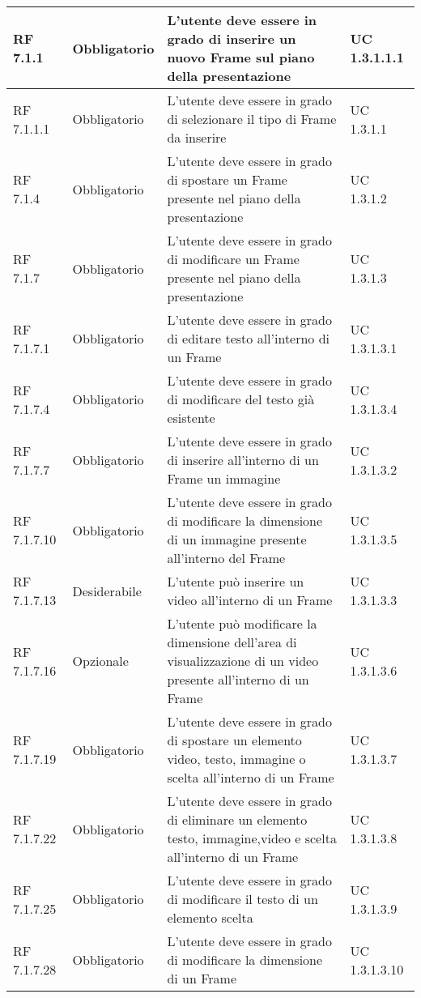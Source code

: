 {\begin{longtable} [c]{| p{2.5cm} | p{2.5cm} | p{6cm} |p{2.5cm}|}
		\hline
		RF 7.1.1 & Obbligatorio & L'utente deve essere in grado di inserire un nuovo Frame\ped{g} sul piano della presentazione\ped{g} & UC 1.3.1.1.1\\
		\hline
		RF 7.1.1.1 & Obbligatorio & L'utente deve essere in grado di selezionare il tipo di Frame\ped{g} da inserire & UC 1.3.1.1\\
		\hline
		RF 7.1.4 & Obbligatorio & L'utente deve essere in grado di spostare un Frame\ped{g} presente nel piano della presentazione\ped{g} & UC 1.3.1.2\\
		\hline
		RF 7.1.7 & Obbligatorio & L'utente deve essere in grado di modificare un Frame\ped{g} presente nel piano della presentazione\ped{g} & UC 1.3.1.3\\
		\hline
		RF 7.1.7.1 & Obbligatorio & L'utente deve essere in grado di editare testo all'interno di un Frame\ped{g} & UC 1.3.1.3.1\\
		\hline
		RF 7.1.7.4 & Obbligatorio & L'utente deve essere in grado di modificare del testo già esistente & UC 1.3.1.3.4\\
		\hline
		RF 7.1.7.7 & Obbligatorio & L'utente deve essere in grado di inserire all'interno di un Frame\ped{g} un immagine & UC 1.3.1.3.2\\
		\hline
		RF 7.1.7.10 & Obbligatorio & L'utente deve essere in grado di modificare la dimensione di un immagine presente all'interno del Frame\ped{g} & UC 1.3.1.3.5\\
		\hline
		RF 7.1.7.13 & Desiderabile & L'utente può inserire un video all'interno di un Frame\ped{g} & UC 1.3.1.3.3\\
		\hline
		RF 7.1.7.16 & Opzionale & L'utente può modificare la dimensione dell’area di visualizzazione di un video presente all'interno di un Frame\ped{g}  & UC 1.3.1.3.6\\
		\hline
		RF 7.1.7.19 & Obbligatorio & L'utente deve essere in grado di spostare un elemento video, testo, immagine o scelta all'interno di un Frame\ped{g} & UC 1.3.1.3.7\\
		\hline
		RF 7.1.7.22 & Obbligatorio & L'utente deve essere in grado di eliminare un elemento testo, immagine,video e scelta all'interno di un Frame\ped{g} & UC 1.3.1.3.8\\
		\hline
		RF 7.1.7.25 & Obbligatorio & L'utente deve essere in grado di modificare il testo di un elemento scelta\ped{g} & UC 1.3.1.3.9\\
		\hline
		RF 7.1.7.28 & Obbligatorio & L'utente deve essere in grado di modificare la dimensione di un Frame\ped{g} & UC 1.3.1.3.10\\

\end{longtable}}
